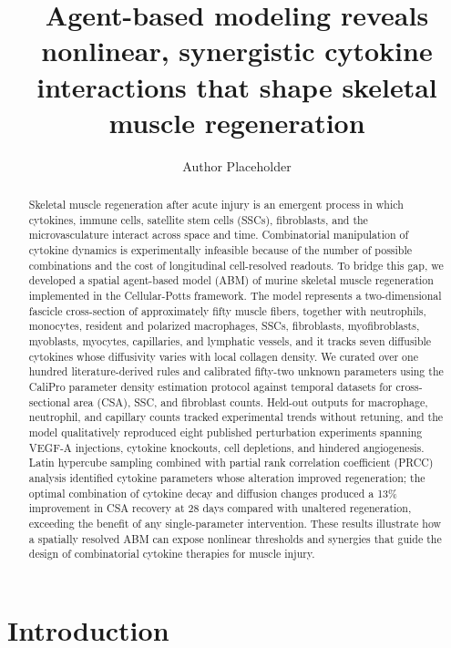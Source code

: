 \documentclass[10pt,letterpaper]{article}
\title{Agent-based modeling reveals nonlinear, synergistic cytokine interactions that shape skeletal muscle regeneration}
\author[1]{Author Placeholder}
\affil[1]{Department Placeholder, Institution Placeholder}
\date{}
\begin{document}
\maketitle

\begin{abstract}
Skeletal muscle regeneration after acute injury is an emergent process in which cytokines, immune cells, satellite stem cells (SSCs), fibroblasts, and the microvasculature interact across space and time. Combinatorial manipulation of cytokine dynamics is experimentally infeasible because of the number of possible combinations and the cost of longitudinal cell-resolved readouts. To bridge this gap, we developed a spatial agent-based model (ABM) of murine skeletal muscle regeneration implemented in the Cellular-Potts framework. The model represents a two-dimensional fascicle cross-section of approximately fifty muscle fibers, together with neutrophils, monocytes, resident and polarized macrophages, SSCs, fibroblasts, myofibroblasts, myoblasts, myocytes, capillaries, and lymphatic vessels, and it tracks seven diffusible cytokines whose diffusivity varies with local collagen density. We curated over one hundred literature-derived rules and calibrated fifty-two unknown parameters using the CaliPro parameter density estimation protocol against temporal datasets for cross-sectional area (CSA), SSC, and fibroblast counts. Held-out outputs for macrophage, neutrophil, and capillary counts tracked experimental trends without retuning, and the model qualitatively reproduced eight published perturbation experiments spanning VEGF-A injections, cytokine knockouts, cell depletions, and hindered angiogenesis. Latin hypercube sampling combined with partial rank correlation coefficient (PRCC) analysis identified cytokine parameters whose alteration improved regeneration; the optimal combination of cytokine decay and diffusion changes produced a 13\% improvement in CSA recovery at 28 days compared with unaltered regeneration, exceeding the benefit of any single-parameter intervention. These results illustrate how a spatially resolved ABM can expose nonlinear thresholds and synergies that guide the design of combinatorial cytokine therapies for muscle injury.
\end{abstract}

\section{Introduction}
\label{sec:introduction}
\end{document}
